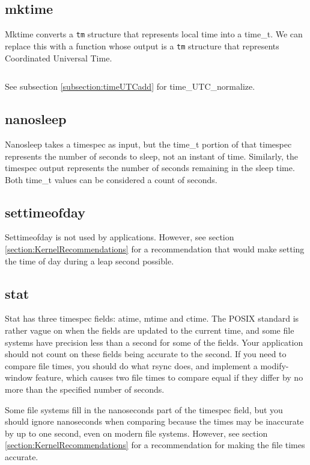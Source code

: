 \documentclass[letterpaper,twoside]{article}
\begin{document}
\subsection{mktime}
\label{subsection:mktime}
Mktime converts a \verb|tm| structure that represents local time into a
{\ttfamily time\_t}.  We can replace this with a function whose output is a
\verb|tm| structure that represents Coordinated Universal Time.
\inputminted[firstline=32]{c}{time_local_to_utc.c}
See subsection \ref{subsection:timeUTCadd} for time\_UTC\_normalize.

\subsection{nanosleep}
Nanosleep takes a timespec as input, but the {\ttfamily time\_t} portion of that
timespec represents the number of seconds to sleep, not an instant of
time.  Similarly, the timespec output represents the number of seconds
remaining in the sleep time.  Both {\ttfamily time\_t} values can be considered
a count of seconds.

\subsection{settimeofday}
Settimeofday is not used by applications.
However, see section \ref{section:KernelRecommendations} for a recommendation
that would make setting the time of day during a leap second possible.

\subsection{stat}
Stat has three timespec fields: atime, mtime and ctime.  The POSIX standard
is rather vague on when the fields are updated to the current time, and
some file systems have precision less than a second for some of the fields.
Your application should not count on these fields being accurate to
the second.  If you need to compare file times, you should do what
rsync does, and implement a modify-window feature, which causes two
file times to compare equal if they differ by no more than the specified
number of seconds.

Some file systems fill in the nanoseconds part of the timespec field,
but you should ignore nanoseconds when comparing because the times may be
inaccurate by up to one second, even on modern file systems.
However, see section \ref{section:KernelRecommendations} for a
recommendation for making the file times accurate.
\end{document}
